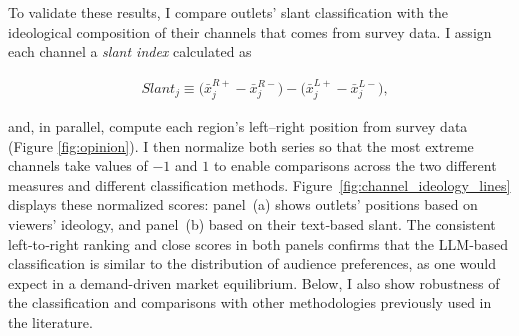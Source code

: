 \documentclass[12pt]{article}
\begin{document}
	
	
	
	
	
	To validate these results, I compare outlets' slant classification with the ideological composition of their channels that comes from survey data. 	I assign each channel a \textit{slant index} calculated as 
	
	
	
	\begin{equation}\label{eq:ideo_index}
		\begin{aligned}
			& Slant_j \equiv \bigl(\bar{x}_j^{R+}-\bar{x}_j^{R-}\bigr)-\bigl(\bar{x}_j^{L+}-\bar{x}_j^{L-}\bigr),
		\end{aligned}
	\end{equation} 
	

and, in parallel, compute each region’s left–right position from  survey data  (Figure \ref{fig:opinion}). I then normalize both series so that the most extreme channels take values of $-1$ and $1$ to enable comparisons across the two different measures and different classification methods. Figure~\ref{fig:channel_ideology_lines} displays these normalized scores: panel~(a) shows outlets' positions based on viewers’ ideology, and panel~(b) based on their text‐based slant. The consistent left‐to‐right ranking and close scores in both panels confirms that the LLM‐based classification is similar to  the distribution of audience preferences, as one would expect in  a demand-driven market equilibrium. Below, I also show robustness of the classification and comparisons with other methodologies previously used in the literature.
		
	
	
\end{document}
